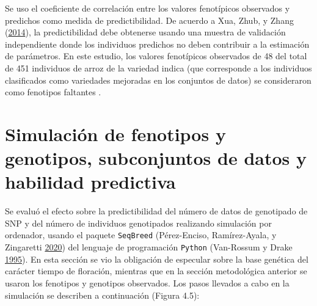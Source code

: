 \documentclass[11pt,spanish,a4paper,oneside,]{book} %
\begin{document}
Se uso el coeficiente de correlación entre los valores fenotípicos observados y predichos como medida de predictibilidad. De acuerdo a Xua, Zhub, y Zhang (\protect\hyperlink{ref-cite:25}{2014}), la predictibilidad debe obtenerse usando una muestra de validación independiente donde los individuos predichos no deben contribuir a la estimación de parámetros. En este estudio, los valores fenotípicos observados de 48 del total de 451 individuos de arroz de la variedad indica (que corresponde a los individuos clasificados como variedades mejoradas en los conjuntos de datos) se consideraron como fenotipos faltantes .

\hypertarget{simulaciuxf3n-de-fenotipos-y-genotipos-subconjuntos-de-datos-y-habilidad-predictiva}{%
\section{Simulación de fenotipos y genotipos, subconjuntos de datos y habilidad predictiva}\label{simulaciuxf3n-de-fenotipos-y-genotipos-subconjuntos-de-datos-y-habilidad-predictiva}}

Se evaluó el efecto sobre la predictibilidad del número de datos de genotipado de SNP y del número de individuos genotipados realizando simulación por ordenador, usando el paquete \texttt{SeqBreed} (Pérez-Enciso, Ramírez-Ayala, y Zingaretti \protect\hyperlink{ref-cite:47}{2020}) del lenguaje de programación \texttt{Python} (Van-Rossum y Drake \protect\hyperlink{ref-cite:53}{1995}). En esta sección se vio la obligación de especular sobre la base genética del carácter tiempo de floración, mientras que en la sección metodológica anterior se usaron los fenotipos y genotipos observados. Los pasos llevados a cabo en la simulación se describen a continuación (Figura 4.5):
\end{document}
